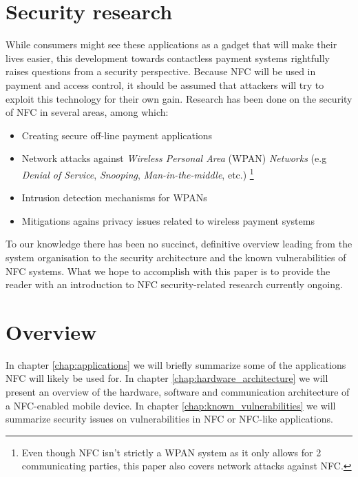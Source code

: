 \section{Security research}
While consumers might see these applications as a gadget that will make their lives easier, this development towards contactless payment systems rightfully raises questions from a security perspective.
Because NFC will be used in payment and access control, it should be assumed that attackers will try to exploit this technology for their own gain. 
Research has been done on the security of NFC in several areas, among which:

\begin{itemize}
\item Creating secure off-line payment applications \cite{1592613}
\item Network attacks against \textit{Wireless Personal Area} (WPAN) \textit{Networks} (e.g \textit{Denial of Service}, \textit{Snooping}, \textit{Man-in-the-middle}, etc.) \footnote{Even though NFC isn't strictly a WPAN system as it only allows for 2 communicating parties, this paper also covers network attacks against NFC.}  \cite{1506342}
\item Intrusion detection mechanisms for WPANs \cite{1361512}
\item Mitigations agains privacy issues related to wireless payment systems \cite{1527027}
\end{itemize}

To our knowledge there has been no succinct, definitive overview leading from the system organisation to the security architecture and the known vulnerabilities of NFC systems.
What we hope to accomplish with this paper is to provide the reader with an introduction to NFC security-related research currently ongoing.

\newpage

\section{Overview}
In chapter \ref{chap:applications} we will briefly summarize some of the applications NFC will likely be used for.
In chapter \ref{chap:hardware_architecture} we will present an overview of the hardware, software and communication architecture of a NFC-enabled mobile device.
In chapter \ref{chap:known_vulnerabilities} we will summarize security issues on vulnerabilities in NFC or NFC-like applications.

